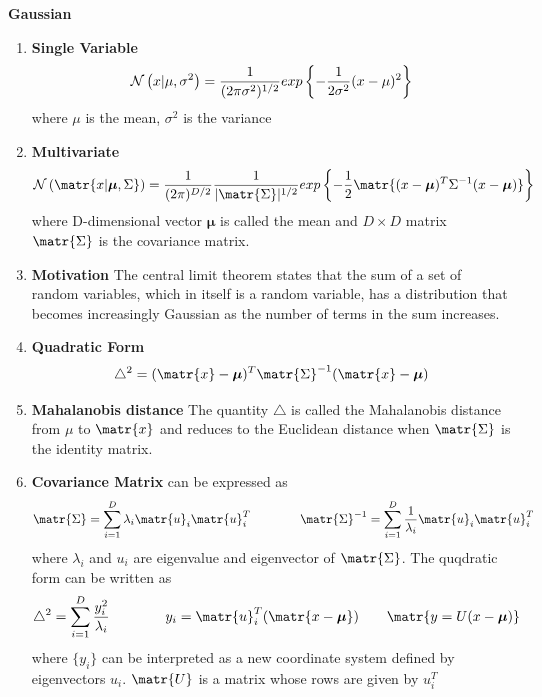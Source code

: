 \documentclass[11pt]{article}
\begin{document}

\begin{defn*}
    \textbf{Gaussian}
    \begin{enumerate}
        \item \textbf{Single Variable} 
        \[
            \mathcal{N}\left(x|\mu, \sigma^2\right)
            = 
            \frac{1}{(2\pi \sigma^2)^{1/2}}
            exp\left\{-\frac{1}{2\sigma^2}(x-\mu)^2\right\}
        \]
        where $\mu$ is the mean, $\sigma^2$ is the variance
        \item \textbf{Multivariate}
        \[
            \normal{\matr{x|\boldsymbol{\mu}, \Sigma}}
            = 
            \frac{1}{(2\pi)^{D/2}}
            \frac{1}{|\matr{\Sigma}|^{1/2}}  
            \exponents{-\frac{1}{2} 
                \matr{(x-\bmu)^T \Sigma^{-1} (x-\bmu)}
            }
        \]
        where D-dimensional vector $\boldsymbol{\mu}$ is called the mean and $D\times D$ matrix $\matr{\Sigma}$ is the covariance matrix. 
        \item \textbf{Motivation} The central limit theorem states that the sum of a set of random variables, which in itself is a random variable, has a distribution that becomes increasingly Gaussian as the number of terms in the sum increases. 
        \item \textbf{Quadratic Form}
        \[
            \triangle^2 = (\matr{x} - \bmu)^T \matr{\Sigma}^{-1}(\matr{x} - \bmu)
        \]
        \item \textbf{Mahalanobis distance} The quantity $\triangle$ is called the Mahalanobis distance from $\mu$ to $\matr{x}$ and reduces to the Euclidean distance when $\matr{\Sigma}$ is the identity matrix. 
        \item \textbf{Covariance Matrix} can be expressed as 
        \[
            \matr{\Sigma} = \sum_{i=1}^D \lambda_i \matr{u}_i \matr{u}_i^T    
            \quad \quad \quad \quad 
            \matr{\Sigma}^{-1} =\sum_{i=1}^D \frac{1}{\lambda_i} \matr{u}_i \matr{u}_i^T
        \]
        where $\lambda_i$ and $u_i$ are eigenvalue and eigenvector of $ \matr{\Sigma}$. The quqdratic form can be written as 
        \[
            \triangle^2 = \sum_{i=1}^D \frac{y_i^2}{\lambda_i}   \quad \quad \quad \quad 
            y_i = \matr{u}_i^T (\matr{x-\bmu})
            \quad \quad 
            \matr{y = U(x-\bmu)}
        \]
        where $\{y_i\}$ can be interpreted as a new coordinate system defined by eigenvectors $u_i$. $\matr{U}$ is a matrix whose rows are given by $u_i^T$
        \begin{center}

\end{center}
\end{enumerate}
\end{defn*}
\end{document}
